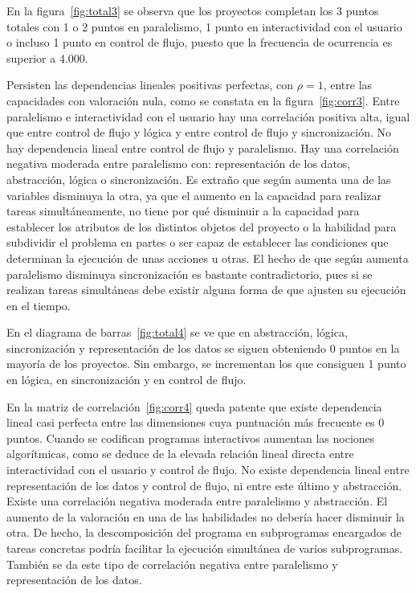 \documentclass[a4paper, 12pt]{book}
\begin{document}
En la figura~\ref{fig:total3} se observa que los proyectos completan los 3 puntos totales con 1 o 2 puntos en paralelismo, 1 punto en interactividad con el usuario o incluso 1 punto en control de flujo, puesto que la frecuencia de ocurrencia es superior a 4.000.

Persisten las dependencias lineales positivas perfectas, con $\rho=1$, entre las capacidades con valoración nula, como se constata en la figura~\ref{fig:corr3}. Entre paralelismo e interactividad con el usuario hay una correlación positiva alta, igual que entre control de flujo y lógica y entre control de flujo y sincronización. No hay dependencia lineal entre control de flujo y paralelismo. Hay una correlación negativa moderada entre paralelismo con: representación de los datos, abstracción, lógica o sincronización. Es extraño que según aumenta una de las variables disminuya la otra, ya que el aumento en la capacidad para realizar tareas simultáneamente, no tiene por qué disminuir a la capacidad para establecer los atributos de los distintos objetos del proyecto o la habilidad para subdividir el problema en partes o ser capaz de establecer las condiciones que determinan la ejecución de unas acciones u otras. El hecho de que según aumenta paralelismo disminuya sincronización es bastante contradictorio, pues si se realizan tareas simultáneas debe existir alguna forma de que ajusten su ejecución en el tiempo.

En el diagrama de barras~\ref{fig:total4} se ve que en abstracción, lógica, sincronización y representación de los datos se siguen obteniendo 0 puntos en la mayoría de los proyectos. Sin embargo, se incrementan los que consiguen 1 punto en lógica, en sincronización y en control de flujo.

En la matriz de correlación~\ref{fig:corr4} queda patente que existe dependencia lineal casi perfecta entre las dimensiones cuya puntuación más frecuente es 0 puntos. Cuando se codifican programas interactivos aumentan las nociones algorítmicas, como se deduce de la elevada relación lineal directa entre interactividad con el usuario y control de flujo. No existe dependencia lineal entre representación de los datos y control de flujo, ni entre este último y abstracción. Existe una correlación negativa moderada entre paralelismo y abstracción. El aumento de la valoración en una de las habilidades no debería hacer disminuir la otra. De hecho, la descomposición del programa en subprogramas encargados de tareas concretas podría facilitar la ejecución simultánea de varios subprogramas. También se da este tipo de correlación negativa entre paralelismo y representación de los datos.%
\end{document}
